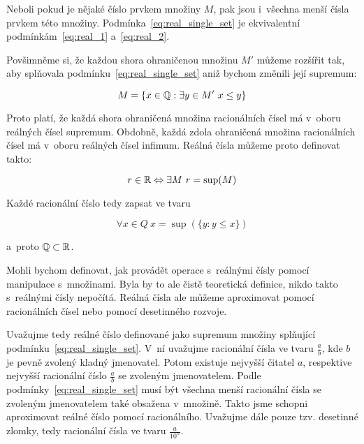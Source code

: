 Neboli pokud je nějaké číslo prvkem množiny \(M\), pak jsou i~všechna menší čísla prvkem této množiny. Podmínka~\eqref{eq:real_single_set} je ekvivalentní podmínkám~\eqref{eq:real_1} a~\eqref{eq:real_2}.

Povšimněme si, že každou shora ohraničenou množinu \(M'\) můžeme rozšířit tak, aby splňovala podmínku~\eqref{eq:real_single_set} aniž bychom změnili její supremum:

\begin{equation}
M = \{x \in \mathbb{Q}: \exists y \in M' \ x \leq y\} 
\end{equation}

Proto platí, že každá shora ohraničená množina racionálních čísel má v~oboru reálných čísel supremum. Obdobně, každá zdola ohraničená množina racionálních čísel má v~oboru reálných čísel infimum. Reálná čísla můžeme proto definovat takto:

\begin{fact}
\begin{equation}
r \in \mathbb{R} \Leftrightarrow \exists M \ r = \sup(M)
\end{equation}
\end{fact}

Každé racionální číslo tedy zapsat ve tvaru

\begin{equation}
\forall x \in Q \ x = \sup(\{y: y \leq x\})
\end{equation}

a~proto \(\mathbb{Q} \subset \mathbb{R}\).

Mohli bychom definovat, jak provádět operace s~reálnými čísly pomocí manipulace s~množinami. Byla by to ale čistě teoretická definice, nikdo takto s~reálnými čísly nepočítá. Reálná čísla ale můžeme aproximovat pomocí racionálních čísel nebo pomocí desetinného rozvoje.

Uvažujme tedy reálné číslo definované jako supremum množiny splňující podmínku~\eqref{eq:real_single_set}. V~ní uvažujme racionální čísla ve tvaru \(\frac{a}{b}\), kde \(b\) je pevně zvolený kladný jmenovatel. Potom existuje nejvyšší čitatel \(a\), respektive nejvyšší racionální číslo \(\frac{a}{b}\) se zvoleným jmenovatelem. Podle podmínky~\eqref{eq:real_single_set} musí být všechna menší racionální čísla se zvoleným jmenovatelem také obsažena v~množině. Takto jsme schopni aproximovat reálné číslo pomocí racionálního. Uvažujme dále pouze tzv. desetinné zlomky, tedy racionální čísla ve tvaru \(\frac{a}{10^n}\).

